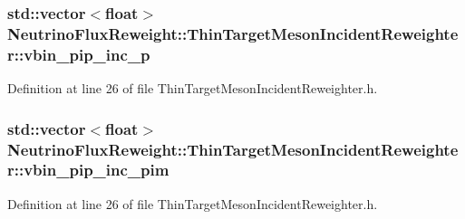 \hypertarget{class_neutrino_flux_reweight_1_1_thin_target_meson_incident_reweighter_a094b50773eedca4a30e58067d55b61c7}{
\subsubsection[{vbin\-\_\-pip\-\_\-inc\-\_\-p}]{\setlength{\rightskip}{0pt plus 5cm}std\-::vector$<$float$>$ Neutrino\-Flux\-Reweight\-::\-Thin\-Target\-Meson\-Incident\-Reweighter\-::vbin\-\_\-pip\-\_\-inc\-\_\-p}}\label{class_neutrino_flux_reweight_1_1_thin_target_meson_incident_reweighter_a094b50773eedca4a30e58067d55b61c7}


Definition at line 26 of file Thin\-Target\-Meson\-Incident\-Reweighter.\-h.

\hypertarget{class_neutrino_flux_reweight_1_1_thin_target_meson_incident_reweighter_aaf511004916c8cde16914f776bd24567}{
\subsubsection[{vbin\-\_\-pip\-\_\-inc\-\_\-pim}]{\setlength{\rightskip}{0pt plus 5cm}std\-::vector$<$float$>$ Neutrino\-Flux\-Reweight\-::\-Thin\-Target\-Meson\-Incident\-Reweighter\-::vbin\-\_\-pip\-\_\-inc\-\_\-pim}}\label{class_neutrino_flux_reweight_1_1_thin_target_meson_incident_reweighter_aaf511004916c8cde16914f776bd24567}


Definition at line 26 of file Thin\-Target\-Meson\-Incident\-Reweighter.\-h.

